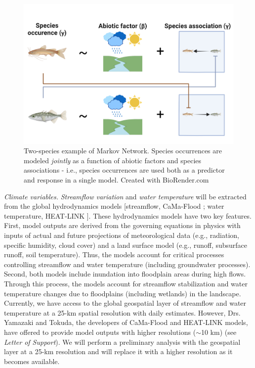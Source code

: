 \documentclass[12pt, class=article, crop=false]{standalone}
\begin{document}
\begin{figure}
    \includegraphics[scale=0.50]{output/fig_mn.pdf}
    \caption{Two-species example of Markov Network. Species occurrences are modeled \textit{jointly} as a function of abiotic factors and species associations - i.e., species occurrences are used both as a predictor and response in a single model. Created with BioRender.com}
    \label{fig:markovnet}
\end{figure}

\textit{Climate variables.} \textit{Streamflow variation} and \textit{water temperature} will be extracted from the global hydrodynamics models [streamflow, CaMa-Flood \citep{yamazaki_physically_2011}; water temperature, HEAT-LINK \citep{tokuda_development_2019}].
These hydrodynamics models have two key features.
First, model outputs are derived from the governing equations in physics with inputs of actual and future projections of meteorological data (e.g., radiation, specific humidity, cloud cover) and a land surface model (e.g., runoff, subsurface runoff, soil temperature).
Thus, the models account for critical processes controlling streamflow and water temperature (including groundwater processes).
Second, both models include inundation into floodplain areas during high flows. Through this process, the models account for streamflow stabilization and water temperature changes due to floodplains (including wetlands) in the landscape.
Currently, we have access to the global geospatial layer of streamflow and water temperature at a 25-km spatial resolution with daily estimates. However, Drs. Yamazaki and Tokuda, the developers of CaMa-Flood and HEAT-LINK models, have offered to provide model outputs with higher resolutions ($\sim$10 km) (see \textit{Letter of Support}).
We will perform a preliminary analysis with the geospatial layer at a 25-km resolution and will replace it with a higher resolution as it becomes available.
\end{document}
